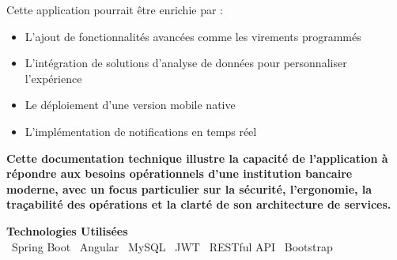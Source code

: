 \documentclass[10pt]{article}
\begin{document}
\vspace{0.8cm}

\begin{infobox}[title=Perspectives d'évolution]
    Cette application pourrait être enrichie par :
    \begin{itemize}
        \item L'ajout de fonctionnalités avancées comme les virements programmés
        \item L'intégration de solutions d'analyse de données pour personnaliser l'expérience
        \item Le déploiement d'une version mobile native
        \item L'implémentation de notifications en temps réel
    \end{itemize}
\end{infobox}

\vspace{0.8cm}

\begin{center}
    \begin{tcolorbox}[
        enhanced,
        width=0.9\textwidth,
        colback=lightgray,
        colframe=bordercolor,
        arc=5pt,
        boxrule=0.5pt
    ]
        \begin{center}
            \textcolor{primary}{\faCheckCircle} \quad
            \textbf{\large\sffamily\textcolor{darktext}{Cette documentation technique illustre la capacité de l'application à répondre aux besoins opérationnels d'une institution bancaire moderne, avec un focus particulier sur la sécurité, l'ergonomie, la traçabilité des opérations et la clarté de son architecture de services.}}
            \quad \textcolor{primary}{\faCheckCircle}
        \end{center}
    \end{tcolorbox}
\end{center}

\vfill

\begin{center}
    \begin{tcolorbox}[
        enhanced,
        width=0.9\textwidth,
        colback=white,
        colframe=primary,
        arc=5pt,
        boxrule=0.5pt
    ]
        \begin{center}
            \textbf{\sffamily\textcolor{primary}{Technologies Utilisées}} \\
            \vspace{0.3cm}
            \faJava~\textcolor{secondary}{Spring Boot} \quad 
            \faAngular~\textcolor{secondary}{Angular} \quad 
            \faDatabase~\textcolor{secondary}{MySQL} \quad 
            \faLock~\textcolor{secondary}{JWT} \quad 
            \faCode~\textcolor{secondary}{RESTful API} \quad 
            ~\textcolor{secondary}{Bootstrap}
        \end{center}
    \end{tcolorbox}
\end{center}
\end{document}
